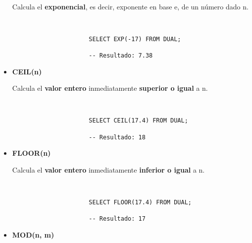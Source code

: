 \begin{itemize}
    Calcula el \textbf{exponencial}, es decir, exponente en base e, de un número dado n.

     \begin{figure}[H]
        \begin{tcolorbox}[sharp corners, colback=yellow!30, colframe=white!20]
            \scriptsize
            \begin{verbatim}


                SELECT EXP(-17) FROM DUAL;

                -- Resultado: 7.38
            \end{verbatim}
        \end{tcolorbox}
    \end{figure}

    \item \textbf{CEIL(n)}

    Calcula el \textbf{valor entero} inmediatamente \textbf{superior o igual} a n.

    \begin{figure}[H]
        \begin{tcolorbox}[sharp corners, colback=yellow!30, colframe=white!20]
            \scriptsize
            \begin{verbatim}


                SELECT CEIL(17.4) FROM DUAL;

                -- Resultado: 18
            \end{verbatim}
        \end{tcolorbox}
    \end{figure}

      \item \textbf{FLOOR(n)}

      Calcula el \textbf{valor entero} inmediatamente \textbf{inferior o igual} a n.

    \begin{figure}[H]
        \begin{tcolorbox}[sharp corners, colback=yellow!30, colframe=white!20]
            \scriptsize
            \begin{verbatim}


                SELECT FLOOR(17.4) FROM DUAL;

                -- Resultado: 17
            \end{verbatim}
        \end{tcolorbox}
    \end{figure}

    \item \textbf{MOD(n, m)}


\end{itemize}

